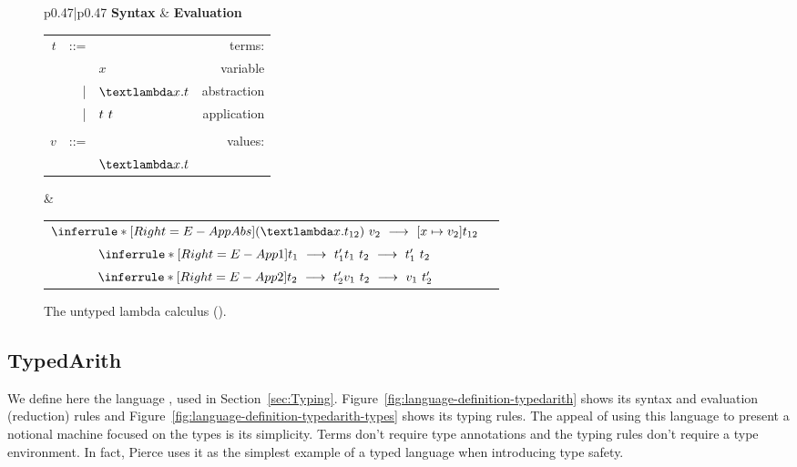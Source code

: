 \begin{figure}[h]
\footnotesize
\begin{tabular}{p{}|p{}}
    \textbf{Syntax} & \textbf{Evaluation} \tabularnewline[1em]
    \begin{tabular}{r@{\hspace{0.5em}}r@{\hspace{0.5em}}lr}
        $t$ & ::= &              & terms:      \\
            &     & $x$          & variable    \\
            & |   & $\abs{x}{t}$ & abstraction \\
            & |   & $t\ t$ & application \\
            &     &              &             \\
        $v$ & ::= &              & values:     \\
            &     & $\abs{x}{t}$ &
    \end{tabular}
&
    \renewcommand{\arraystretch}{3.0}
    \begin{tabular}{cr}
        $\inferrule*[Right=E-AppAbs]
            { }
            {\app{(\abs{x}{t_{12}})}{v_2}\ \longrightarrow\ \subst{v_2}{x}{t_{12}}}$ \label{rule:E-AppAbs} & \\
        $\inferrule*[Right=E-App1]
            {t_1\ \longrightarrow\ t_1'}
            {\app{t_1}{t_2}\ \longrightarrow\ \app{t_1'}{t_2}}$ & \\
        $\inferrule*[Right=E-App2]
            {t_2\ \longrightarrow\ t_2'}
            {\app{v_1}{t_2}\ \longrightarrow\ \app{v_1}{t_2'}}$ & 
    \end{tabular}
\end{tabular}
\caption{The untyped lambda calculus ().}
\label{fig:language-definition-untypedlambda}
\end{figure}
  

\subsection{TypedArith}
\label{sec:language-definition-typedarith}

We define here the language ,
used in Section~\ref{sec:Typing}.
Figure~\ref{fig:language-definition-typedarith}
shows its syntax and evaluation (reduction) rules
and Figure~\ref{fig:language-definition-typedarith-types}
shows its typing rules.
%
The appeal
of using this language to present a notional machine
focused on the types is its simplicity.
Terms don't require type annotations
and the typing rules don't require a type environment.
In fact,
Pierce uses it as
the simplest example of a typed language
when introducing type safety.



